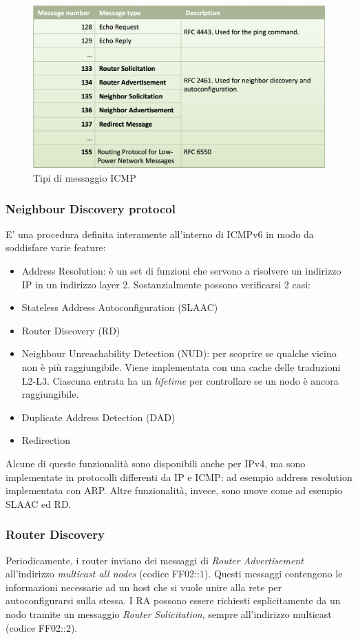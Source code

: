 \documentclass{article}
\begin{document}
\begin{figure}[H]
\centering
\includegraphics[scale=0.3]{figures/tipi ICMP.png}
\caption{Tipi di messaggio ICMP}
\end{figure}

\subsubsection{Neighbour Discovery protocol}
E' una procedura definita interamente all'interno di ICMPv6 in modo da soddisfare varie feature:
\begin{itemize}
    \item Address Resolution: è un set di funzioni che servono a risolvere un indirizzo IP in un indirizzo layer 2. Sostanzialmente possono verificarsi 2 casi:
    \item Stateless Address Autoconfiguration (SLAAC)
    \item Router Discovery (RD)
    \item Neighbour Unreachability Detection (NUD): per scoprire se qualche vicino non è più raggiungibile. Viene implementata con una cache delle traduzioni L2-L3. Ciascuna entrata ha un \textit{lifetime} per controllare se un nodo è ancora raggiungibile.
    \item Duplicate Address Detection (DAD)
    \item Redirection
\end{itemize}
Alcune di queste funzionalità sono disponibili anche per IPv4, ma sono implementate in protocolli differenti da IP e ICMP: ad esempio address resolution implementata con ARP. Altre funzionalità, invece, sono nuove come ad esempio SLAAC ed RD.


\subsubsection{Router Discovery}
Periodicamente, i router inviano dei messaggi di \textit{Router Advertisement} all'indirizzo \textit{multicast all nodes} (codice FF02::1). Questi messaggi contengono le informazioni necessarie ad un host che si vuole unire alla rete per autoconfigurarsi sulla stessa. I RA possono essere richiesti esplicitamente da un nodo tramite un messaggio \textit{Router Solicitation}, sempre all'indirizzo multicast (codice FF02::2).
\end{document}

